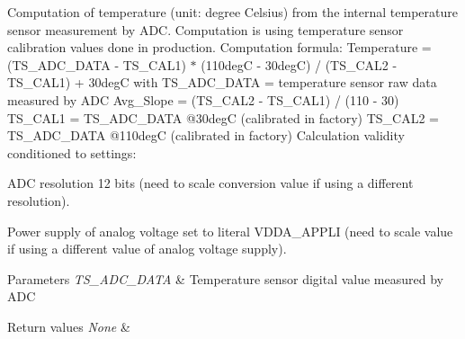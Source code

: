 Computation of temperature (unit\-: degree Celsius) from the internal temperature sensor measurement by A\-D\-C. Computation is using temperature sensor calibration values done in production. Computation formula\-: Temperature = (T\-S\-\_\-\-A\-D\-C\-\_\-\-D\-A\-T\-A -\/ T\-S\-\_\-\-C\-A\-L1) $\ast$ (110deg\-C -\/ 30deg\-C) / (T\-S\-\_\-\-C\-A\-L2 -\/ T\-S\-\_\-\-C\-A\-L1) + 30deg\-C with T\-S\-\_\-\-A\-D\-C\-\_\-\-D\-A\-T\-A = temperature sensor raw data measured by A\-D\-C Avg\-\_\-\-Slope = (T\-S\-\_\-\-C\-A\-L2 -\/ T\-S\-\_\-\-C\-A\-L1) / (110 -\/ 30) T\-S\-\_\-\-C\-A\-L1 = T\-S\-\_\-\-A\-D\-C\-\_\-\-D\-A\-T\-A @30deg\-C (calibrated in factory) T\-S\-\_\-\-C\-A\-L2 = T\-S\-\_\-\-A\-D\-C\-\_\-\-D\-A\-T\-A @110deg\-C (calibrated in factory) Calculation validity conditioned to settings\-: 


\begin{DoxyItemize}
\item A\-D\-C resolution 12 bits (need to scale conversion value if using a different resolution).
\item Power supply of analog voltage set to literal V\-D\-D\-A\-\_\-\-A\-P\-P\-L\-I (need to scale value if using a different value of analog voltage supply). 
\begin{DoxyParams}{Parameters}
{\em T\-S\-\_\-\-A\-D\-C\-\_\-\-D\-A\-T\-A} & Temperature sensor digital value measured by A\-D\-C \\
\hline
\end{DoxyParams}

\begin{DoxyRetVals}{Return values}
{\em None} & \\
\hline
\end{DoxyRetVals}

\end{DoxyItemize}